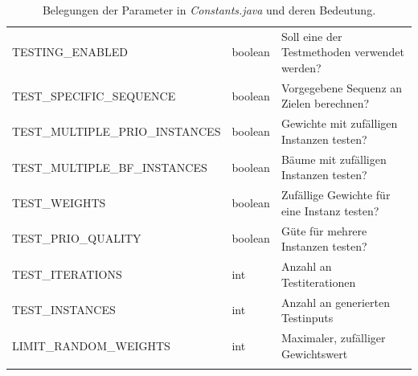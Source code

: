 \documentclass[german,version-2019-11]{uzl-thesis}
\begin{document}
\begin{table}[htpb]
{\begin{tabular}{lll}
TESTING\_ENABLED & boolean                & Soll eine der Testmethoden verwendet werden? \\\uzlhline
TEST\_SPECIFIC\_SEQUENCE & boolean        & Vorgegebene Sequenz an Zielen berechnen?\\ \uzlhline
TEST\_MULTIPLE\_PRIO\_INSTANCES & boolean & Gewichte mit zufälligen Instanzen testen?\\ \uzlhline
TEST\_MULTIPLE\_BF\_INSTANCES & boolean   & Bäume mit zufälligen Instanzen testen? \\ \uzlhline 
TEST\_WEIGHTS & boolean                   & Zufällige Gewichte für eine Instanz testen? \\ \uzlhline
TEST\_PRIO\_QUALITY & boolean             & Güte für mehrere Instanzen testen? \\ \uzlhline
TEST\_ITERATIONS  & int                   & Anzahl an Testiterationen \\ \uzlhline
TEST\_INSTANCES & int                     & Anzahl an generierten Testinputs \\ \uzlhline
LIMIT\_RANDOM\_WEIGHTS & int              & Maximaler, zufälliger Gewichtswert \\ \uzlhline
\end{tabular}}
\caption{Belegungen der Parameter in \emph{Constants.java} und deren Bedeutung.}
\label{Constants}
\end{table}

%
\end{document}
